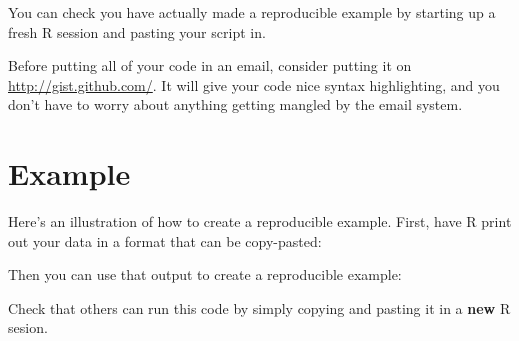 You can check you have actually made a reproducible example by starting
up a fresh R session and pasting your script in.

Before putting all of your code in an email, consider putting it on
\url{http://gist.github.com/}. It will give your code nice syntax
highlighting, and you don't have to worry about anything getting mangled
by the email system.

\section{Example}

Here's an illustration of how to create a reproducible example. First,
have R print out your data in a format that can be copy-pasted:

\begin{Shaded}
\begin{Highlighting}[]
\end{Highlighting}
\end{Shaded}

Then you can use that output to create a reproducible example:

\begin{Shaded}
\begin{Highlighting}[]

\StringTok{ }\NormalTok{(}\NormalTok{(} \NormalTok{(}\NormalTok{, }\NormalTok{, }\NormalTok{, }\NormalTok{, }\NormalTok{, }\NormalTok{), } \NormalTok{(}\NormalTok{, }\NormalTok{,}
\NormalTok{, }\NormalTok{, }\NormalTok{, }\NormalTok{)), } \NormalTok{(}\NormalTok{, }\NormalTok{), } \NormalTok{(}\NormalTok{,}
 \NormalTok{, } \NormalTok{)}

\NormalTok{(}\StringTok{ }\NormalTok{()}
\end{Highlighting}
\end{Shaded}

Check that others can run this code by simply copying and pasting it in
a \textbf{new} R sesion.
